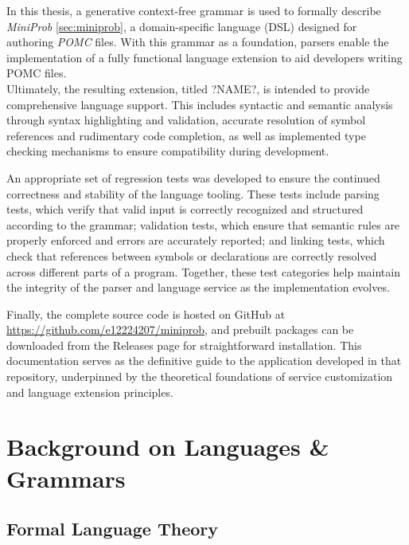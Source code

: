 In this thesis, a generative context-free grammar is used to formally describe \textit{MiniProb} \ref{sec:miniprob}, a domain-specific language (DSL) designed for authoring \textit{POMC} files.
With this grammar as a foundation, parsers enable the implementation of a fully functional language extension to aid developers writing POMC files.\\
Ultimately, the resulting extension, titled ?NAME?, is intended to provide comprehensive language support. This includes syntactic and semantic analysis
through syntax highlighting and validation, accurate resolution of symbol references and rudimentary code completion, as well as implemented type checking mechanisms
to ensure compatibility during development.

An appropriate set of regression tests was developed to ensure the continued correctness and stability of the language tooling.
These tests include parsing tests, which verify that valid input is correctly recognized and structured according to the grammar; validation tests,
which ensure that semantic rules are properly enforced and errors are accurately reported; and linking tests, which check that references between symbols
or declarations are correctly resolved across different parts of a program. Together, these test categories help maintain the integrity of the parser and language service as
the implementation evolves.

Finally, the complete source code is hosted on GitHub at \url{https://github.com/e12224207/miniprob}, and prebuilt  packages can be downloaded from the Releases page for straightforward installation.
This documentation serves as the definitive guide to the application developed in that repository, underpinned by the theoretical foundations of service customization and language extension principles.

\chapter{Background on Languages \& Grammars}

\label{sec:formallang}
\section{Formal Language Theory}

